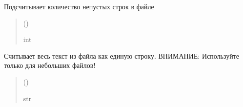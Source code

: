 \documentclass[a4paper,11pt,russian,openany,oneside]{sphinxmanual}
\begin{document}
\begin{savenotes}\begin{fulllineitems}
\label{\detokenize{_autosummary/scan_module.read_files:scan_module.read_files.count_lines_in_file}}
\pysigstartsignatures
\pysiglinewithargsret
{}
{}
{}
\pysigstopsignatures
\sphinxAtStartPar
Подсчитывает количество непустых строк в файле
\begin{quote}\begin{description}
\sphinxAtStartPar
{} ()

\sphinxAtStartPar
int

\end{description}\end{quote}

\end{fulllineitems}\end{savenotes}


\begin{savenotes}\begin{fulllineitems}
\label{\detokenize{_autosummary/scan_module.read_files:scan_module.read_files.get_text_from_file}}
\pysigstartsignatures
\pysiglinewithargsret
{}
{}
{}
\pysigstopsignatures
\sphinxAtStartPar
Считывает весь текст из файла как единую строку.
ВНИМАНИЕ: Используйте только для небольших файлов!
\begin{quote}\begin{description}
\sphinxAtStartPar
{} ()

\sphinxAtStartPar
str

\end{description}\end{quote}

\end{fulllineitems}\end{savenotes}
\end{document}
